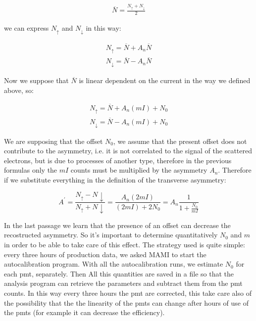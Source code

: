 \begin{align*}
\overline{N} = \frac{N_{\uparrow} + N_{\downarrow}}{2}
\end{align*} 

we can express $N_{\uparrow}$ and $N_{\downarrow}$ in this way:

\begin{align*}
N_{\uparrow} = \overline{N} + A_{n}\overline{N} \\
N_{\downarrow} = \overline{N} - A_{n}\overline{N} 
\end{align*}

Now we suppose that $\overline{N}$ is linear dependent on the current in the way we defined above, so:

\begin{align*}
N_{\uparrow} = \overline{N} + A_{n}(mI) + N_{0} \\
N_{\downarrow} = \overline{N} - A_{n}(mI) + N_{0} 
\end{align*}

We are supposing that the offset $N_{0}$, we assume that the present offset does not contribute to the asymmetry, i.e. it is not correlated to the signal of the scattered electrons, but is due to processes of another type, therefore in the previous formulas only the $mI$ counts must be multiplied by the asymmetry $A_{n}$. Therefore if we substitute everything in the definition of the transverse asymmetry:

\begin{equation} \label{eq:Systematic}
A^{'} = \dfrac{N_{\uparrow} - N{\downarrow}}{N_{\uparrow} + N{\downarrow}} = \dfrac{A_{n} (2mI)}{ (2mI) + 2N_{0} } = A_{n} \dfrac{1}{1 + \frac{N_{0}}{mI}}
\end{equation} 

In the last passage we learn that the presence of an offset can decrease the recostructed asymmetry. So it's important to determine quantitatively $N_{0}$ and $m$ in order to be able to take care of this effect. The strategy used is quite simple: every three hours of production data, we asked MAMI to start the autocalibration program. With all the autocalibration runs, we estimate $N_{0}$ for each pmt, separately. Then All this quantities are saved in a file so that the analysis program can retrieve the parameters and subtract them from the pmt counts. \medskip
In this way every three hours the pmt are corrected, this take care also of the possibility that the the linearity of the pmts can change after hours of use of the pmts (for example it can decrease the efficiency).

